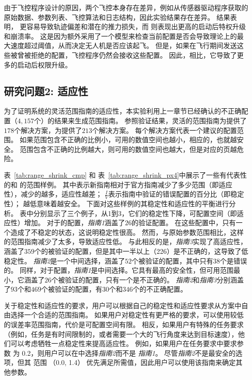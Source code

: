 由于飞控程序设计的原因，两个飞控本身存在差异，例如从传感器驱动程序获取的原始数据、参数列表、飞控算法和日志结构，因此实验结果存在差异。
结果表明， 更容易导致轨迹偏差和潜在的推力损失，而  则表现出更高的启动后特权升级和崩溃率。
这是因为额外采用了一个模型来检查当前配置是否会导致理论上的最大速度超过阈值，从而决定无人机是否应该起飞。
但是，如果在飞行期间发送这些被曾被拒绝的配置，飞控程序仍然会接收这些配置。
因此，相比，它导致了更多的启动后权限升级。

\subsection{研究问题2: 适应性}
为了证明系统的灵活范围指南的适应性，本实验利用上一章节已经确认的不正确配置（$4,157$个）的结果来生成范围指南。
参照验证结果，灵活的范围指南为提供了$178$个解决方案，为提供了$213$个解决方案。
每个解决方案代表一个建议的配置范围。
如果范围包含不正确的比例小，可用的数值空间也越小，相应的，也就越安全。
范围包含不正确的比例越大，则可用的数值空间也越大，但是对应的页越危险。



表~\ref{tab:range_shrink_cmp} 和 表~\ref{tab:range_shrink_px4}中展示了一些有代表性的和 的范围样例。
其中表示新指南相对于官方指南减少了多少范围（即适应性），减少的越多，适应性越差；
$\frac{I}{V}$表示指南中验证的错误配置的百分比（即稳定性）； 越低意味着越安全。
下面对这些样例的其稳定性和适应性的平衡进行分析。
表中分别显示了三个例子，从1到3，它们的稳定性下降，可配置空间（即适应性）增加。
对于的配置，\textit{指南1}涵盖了$26$的验证配置。
在这些配置中，只有一个造成了不稳定的状态，这说明稳定性很高。
然而，与原始参数范围相比，这样的范围指南减少了太多，导致适应性低。
与此相反的是，\textit{指南3}实现了高适应性，涵盖了$359$个的被验证的配置，但是其中一半以上（226）是不正确的，这导致了低稳定性。
\textit{指南2}是一个中间选择，涵盖了$52$个被验证的配置，其中只有$38$个是错误的。
同样，对于配置，\textit{指南1}是中间选择。它具有最高的安全性，但可用范围最小，它涵盖了$26$个被验证的配置，只有一个是不正确的。
\textit{指南2}和\textit{指南3}分别涵盖了$93$个和$469$个被验证的配置，有$30$个和$346$个的不正确配置。

关于稳定性和适应性的要求，用户可以根据自己的稳定性和适应性要求从方案中自由选择一个合适的范围指南。
如果用户对稳定性有更严格的要求，可以使用较低的误差率范围指南，代价是可配置空间有限。
相反，如果用户有特殊的任务要求（例如，任务是有时间限制的，或者需要一个大的飞行角度来达到目标速度），他们可以考虑牺牲一点稳定性来提高适应性。
例如，如果用户在任务要求中要求参数  为 0.2，则用户可以在中选择\textit{指南2}而不是 \textit{指南1}。
尽管\textit{指南2}不是最安全的选项，但其 范围 （0.0, 1.4） 优先满足所需值，因此用户可以使用该指南来确定其他参数。


